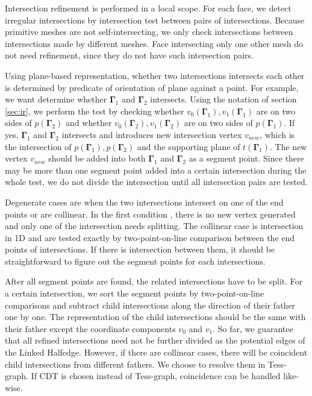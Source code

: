 \documentclass[10pt,journal,compsoc]{IEEEtran}
\begin{document}
Intersection refinement is performed in a local scope. For each face, we detect irregular intersections by intersection test between pairs of intersections. Because primitive meshes are not self-intersecting, we only check intersections between intersections made by different meshes. Face intersecting only one other mesh do not need refinement, since they do not have such intersection pairs.

Using plane-based representation, whether two intersections intersects each other is determined by predicate of orientation of plane against a point. For example, we want determine whether ${\boldsymbol{\Gamma}}_1$ and ${\boldsymbol{\Gamma}}_2$ intersects. Using the notation of section \ref{sec:ir}, we perform the test by checking whether $v_0({\boldsymbol{\Gamma}}_1), v_1({\boldsymbol{\Gamma}}_1)$ are on two sides of $p({\boldsymbol{\Gamma}}_2)$ and whether $v_0({\boldsymbol{\Gamma}}_2), v_1({\boldsymbol{\Gamma}}_2)$ are on two sides of $p({\boldsymbol{\Gamma}}_1)$. If yes, ${\boldsymbol{\Gamma}}_1$ and ${\boldsymbol{\Gamma}}_2$ intersects and introduces new intersection vertex $v_{new}$, which is the intersection of $p({\boldsymbol{\Gamma}}_1), p({\boldsymbol{\Gamma}}_2)$ and the supporting plane of $t({\boldsymbol{\Gamma}}_1)$. The new vertex $v_{new}$ should be added into both ${\boldsymbol{\Gamma}}_1$ and ${\boldsymbol{\Gamma}}_2$ as a segment point. Since there may be more than one segment point added into a certain intersection during the whole test, we do not divide the intersection until all intersection pairs are tested.

Degenerate cases are when the two intersections intersect on one of the end points or are collinear. In the first condition {\color{red}{Fig. ??(a)}}, there is no new vertex generated and only one of the intersection needs splitting. The collinear case {\color{red}{Fig. ??(b)}} is intersection in 1D and are tested exactly by two-point-on-line comparison between the end points of intersections. If there is intersection between them, it should be straightforward to figure out the segment points for each intersections.

After all segment points are found, the related intersections have to be split. For a certain intersection, we sort the segment points by two-point-on-line comparisons and subtract child intersections along the direction of their father one by one. The representation of the child intersections should be the same with their father except the coordinate components $v_0$ and $v_1$. So far, we guarantee that all refined intersections need not be further divided as the potential edges of the Linked Halfedge. However, if there are collinear cases, there will be coincident child intersections from different fathers. We choose to resolve them in Tess-graph. If CDT is chosen instead of Tess-graph, coincidence can be handled like-wise.
\end{document}
